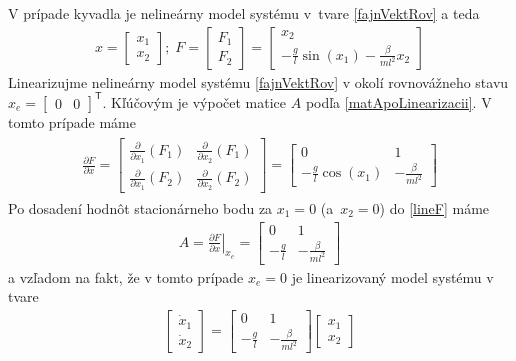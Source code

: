\documentclass[a4paper, 10pt, ]{article}
\begin{document}
V prípade kyvadla je nelineárny model systému v~tvare \eqref{fajnVektRov} a teda
\begin{align}
	x=
	\begin{bmatrix}
		{x}_1 \\ {x}_2
	\end{bmatrix}
	;
	\;
	F=
	\begin{bmatrix}
		F_1 \\ F_2
	\end{bmatrix}
	=
	\begin{bmatrix}
		x_2 \\ - \frac{g}{l} \sin(x_1) - \frac{\beta}{ml^2} x_2
	\end{bmatrix}
\end{align}
Linearizujme nelineárny model systému \eqref{fajnVektRov} v okolí rovnovážneho stavu $x_e = \begin{bmatrix} 0 & 0 \end{bmatrix}^\mathsf{T}$. Kľúčovým je výpočet matice $A$ podľa \eqref{matApoLinearizacii}. V tomto prípade máme
\begin{align} \label{lineF}
	\begin{split}
	\frac{\partial F}{\partial x}
	=
	\begin{bmatrix}
		\displaystyle\frac{\partial}{\partial x_1} \left( F_1 \right) & \displaystyle\frac{\partial}{\partial x_2} \left( F_1 \right) \\
		\displaystyle\frac{\partial}{\partial x_1} \left( F_2 \right) & \displaystyle\frac{\partial}{\partial x_2} \left( F_2 \right)
	\end{bmatrix} =
	\begin{bmatrix}
		0 & 1 \\
		- \displaystyle\frac{g}{l} \cos(x_1) & - \displaystyle\frac{\beta}{ml^2}
	\end{bmatrix}
\end{split}
\end{align}
Po dosadení hodnôt stacionárneho bodu za $x_1 = 0$ (a~$x_2 = 0$) do \eqref{lineF} máme
\begin{align}
	A = \left. \frac{\partial F}{\partial x} \right|_{x_e}
	=
	\begin{bmatrix}
		0 & 1 \\
		- \displaystyle\frac{g}{l}  & - \displaystyle\frac{\beta}{ml^2}
	\end{bmatrix}
\end{align}
a vzľadom na fakt, že v tomto prípade $x_e = 0$ je linearizovaný model systému v tvare
\begin{align} \label{vyslednyLinearnyModel}
	\begin{bmatrix}
		\dot{x}_1 \\ \dot{x}_2
	\end{bmatrix}
	=
	\begin{bmatrix}
		0 & 1 \\
		- \displaystyle\frac{g}{l}  & - \displaystyle\frac{\beta}{ml^2}
	\end{bmatrix}
	\begin{bmatrix}
		{x}_1 \\ {x}_2
	\end{bmatrix}
\end{align}
\end{document}
